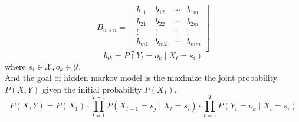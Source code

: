 \documentclass[12pt,a4paper]{article}
\begin{document}
\begin{equation}
    B_{n \times n} = 
    \left[ {\begin{array}{cccc}
        b_{11} & b_{12} & \cdots & b_{1m}\\
        b_{21} & b_{22} & \cdots & b_{2m}\\
        \vdots & \vdots & \ddots & \vdots\\
        b_{m1} & b_{m2} & \cdots & b_{mm}\\
    \end{array} } \right]
\end{equation}
\begin{equation}
    b_{ik} = P(Y_{t} = o_k \mid X_t = s_i) 
\end{equation}
where $s_i \in \mathcal{X}, o_k \in \mathcal{Y}$.
\\[1ex]
And the goal of hidden markov model is the maximize the joint probability $P(X, Y)$ given the initial probability $P(X_1)$.
\begin{equation}
    P(X, Y) = P(X_1) \cdot \prod_{t=1}^{T-1}P(X_{t+1}=s_j \mid X_{t}=s_i) \cdot \prod_{t=1}^{T} P(Y_t=o_k \mid X_t=s_i)
\end{equation}
\end{document}

